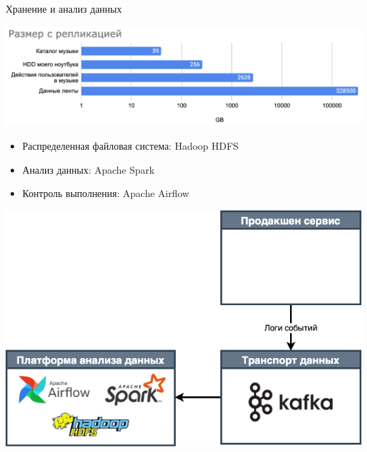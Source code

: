 \documentclass[11pt,aspectratio=169]{beamer}
\newcommand{\vkitem}{\item[\color{vk}$\bullet$]}
\begin{document}
\begin{frame}{Хранение и анализ данных}

\begin{center}
\includegraphics[scale=0.5]{images/data-size.png}
\end{center}

\pause

\begin{itemize}[<+->]
\vkitem Распределенная файловая система: Hadoop HDFS
\vkitem Анализ данных: Apache Spark
\vkitem Контроль выполнения: Apache Airflow
\end{itemize}

\end{frame}

\begin{frame}{}

\begin{center}
\includegraphics[scale=0.35]{images/bigdata.png}
\end{center}

\end{frame}

{
\begin{frame}[plain]
\end{frame}
}
\end{document}
